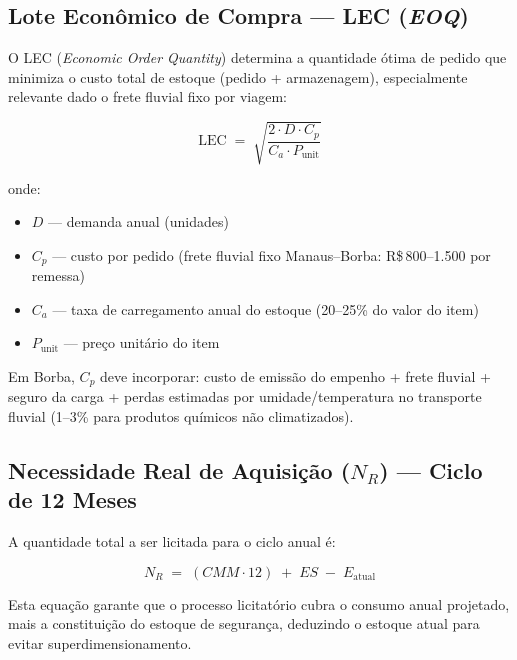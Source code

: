 \documentclass[12pt,a4paper]{article}
\begin{document}
\subsection{Lote Econômico de Compra --- LEC (\textit{EOQ})}

O LEC (\textit{Economic Order Quantity}) determina a quantidade ótima de pedido que minimiza o custo total de estoque (pedido + armazenagem), especialmente relevante dado o frete fluvial fixo por viagem:

\begin{formulabox}
\[
  \text{LEC} \;=\; \sqrt{\frac{2 \cdot D \cdot C_p}{C_a \cdot P_{\text{unit}}}}
\]
\end{formulabox}

\noindent onde:
\begin{itemize}
  \item $D$ --- demanda anual (unidades)
  \item $C_p$ --- custo por pedido (frete fluvial fixo Manaus--Borba: R\$\,800--1.500 por remessa)
  \item $C_a$ --- taxa de carregamento anual do estoque (20--25\% do valor do item)
  \item $P_{\text{unit}}$ --- preço unitário do item
\end{itemize}

Em Borba, $C_p$ deve incorporar: custo de emissão do empenho + frete fluvial + seguro da carga + perdas estimadas por umidade/temperatura no transporte fluvial (1--3\% para produtos químicos não climatizados).

\subsection{Necessidade Real de Aquisição (\texorpdfstring{$N_R$}{NR}) --- Ciclo de 12 Meses}

A quantidade total a ser licitada para o ciclo anual é:

\begin{formulabox}
\[
  N_R \;=\; (CMM \cdot 12) \;+\; ES \;-\; E_{\text{atual}}
\]
\end{formulabox}

Esta equação garante que o processo licitatório cubra o consumo anual projetado, mais a constituição do estoque de segurança, deduzindo o estoque atual para evitar superdimensionamento.
\end{document}
